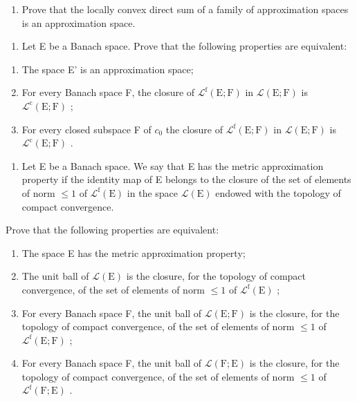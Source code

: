 \begin{enumerate}
\def\labelenumi{\alph{enumi})}
\setcounter{enumi}{1}
\tightlist
\item
  Prove that the locally convex direct sum of a family of approximation spaces is an approximation space.
\end{enumerate}

\begin{enumerate}
\def\labelenumi{\arabic{enumi})}
\setcounter{enumi}{33}
\tightlist
\item
  Let E be a Banach space. Prove that the following properties are equivalent:
\end{enumerate}

\begin{enumerate}
\def\labelenumi{(\roman{enumi})}
\item
  The space E' is an approximation space;
\item
  For every Banach space F, the closure of \(\mathcal{L}^{\mathrm{f}}(\mathrm{E};\mathrm{F})\) in \(\mathcal{L}(\mathrm{E};\mathrm{F})\) is \(\mathcal{L}^{\mathrm{c}}(\mathrm{E};\mathrm{F})\) ;
\item
  For every closed subspace F of \(c_{0}\) the closure of \(\mathcal{L}^{\mathrm{f}}(\mathrm{E};\mathrm{F})\) in \(\mathcal{L}(\mathrm{E};\mathrm{F})\) is \(\mathcal{L}^{\mathrm{c}}(\mathrm{E};\mathrm{F})\) .
\end{enumerate}

\begin{enumerate}
\def\labelenumi{\arabic{enumi})}
\setcounter{enumi}{34}
\tightlist
\item
  Let E be a Banach space. We say that E has the metric approximation property if the identity map of E belongs to the closure of the set of elements of norm \(\leqslant 1\) of \(\mathcal{L}^{\mathrm{f}}(\mathrm{E})\) in the space \(\mathcal{L}(\mathrm{E})\) endowed with the topology of compact convergence.
\end{enumerate}

Prove that the following properties are equivalent:

\begin{enumerate}
\def\labelenumi{(\roman{enumi})}
\item
  The space E has the metric approximation property;
\item
  The unit ball of \(\mathcal{L}(\mathrm{E})\) is the closure, for the topology of compact convergence, of the set of elements of norm \(\leqslant 1\) of \(\mathcal{L}^{\mathrm{f}}(\mathrm{E})\) ;
\item
  For every Banach space F, the unit ball of \(\mathcal{L}(\mathrm{E};\mathrm{F})\) is the closure, for the topology of compact convergence, of the set of elements of norm \(\leqslant 1\) of \(\mathcal{L}^{\mathrm{f}}(\mathrm{E};\mathrm{F})\) ;
\item
  For every Banach space F, the unit ball of \(\mathcal{L}(\mathrm{F};\mathrm{E})\) is the closure, for the topology of compact convergence, of the set of elements of norm \(\leqslant 1\) of \(\mathcal{L}^{\mathrm{f}}(\mathrm{F};\mathrm{E})\) .
\end{enumerate}

